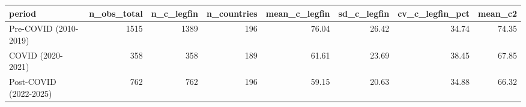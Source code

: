 \begin{tabular}{lrrrrrrr}
\toprule
period & n_obs_total & n_c_legfin & n_countries & mean_c_legfin & sd_c_legfin & cv_c_legfin_pct & mean_c2 \\
\midrule
Pre-COVID (2010-2019) & 1515 & 1389 & 196 & 76.04 & 26.42 & 34.74 & 74.35 \\
COVID (2020-2021) & 358 & 358 & 189 & 61.61 & 23.69 & 38.45 & 67.85 \\
Post-COVID (2022-2025) & 762 & 762 & 196 & 59.15 & 20.63 & 34.88 & 66.32 \\
\bottomrule
\end{tabular}
